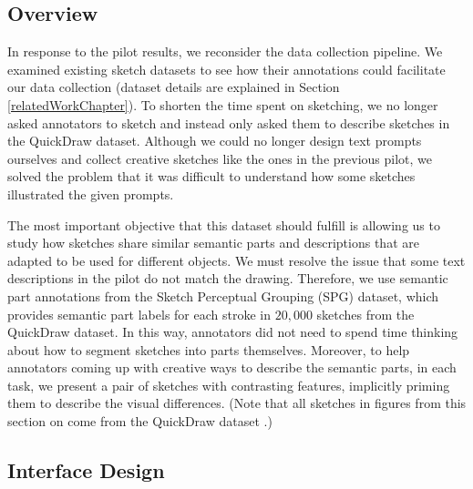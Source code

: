 
\subsection{Overview}
In response to the pilot results, we reconsider the data collection pipeline. 
We examined existing sketch datasets to see how their annotations could facilitate our data collection (dataset details are explained in Section \ref{relatedWorkChapter}).    
To shorten the time spent on sketching, we no longer asked annotators to sketch and instead only asked them to describe sketches in the QuickDraw dataset. 
Although we could no longer design text prompts ourselves and collect creative sketches like the ones in the previous pilot, we solved the problem that it was difficult to understand how some sketches illustrated the given prompts. 

The most important objective that this dataset should fulfill is allowing us to study how sketches share similar semantic parts and descriptions that are adapted to be used for different objects. We must resolve the issue that some text descriptions in the pilot do not match the drawing.  
Therefore, we use semantic part annotations from the Sketch Perceptual Grouping (SPG) dataset, which provides semantic part labels for each stroke in $20,000$ sketches from the QuickDraw dataset. In this way, annotators did not need to spend time thinking about how to segment sketches into parts themselves. 
Moreover, to help annotators coming up with creative ways to describe the semantic parts, in each task, we present a pair of sketches with contrasting features, implicitly priming them to describe the visual differences. (Note that all sketches in figures from this section on come from the QuickDraw dataset \citep{ha2017neural}.)

\subsection{Interface Design}


